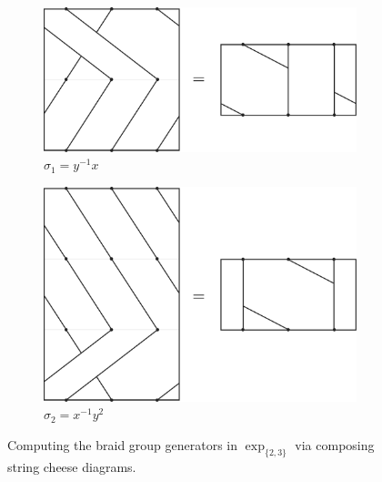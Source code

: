 \documentclass[12pt,twoside]{reedthesis}
\theoremstyle{definition}
\newcommand{\exptwothree}{\exp_{\{2,3\}}}
\begin{document}
\begin{figure}[h]
  \centering
  \begin{subfigure}[c]{0.47\textwidth}
    \centering
    \includegraphics[width=\linewidth]{figures/braid_gen_y_inv_x_equals.pdf}
    \caption{$\sigma_1 = y^{-1} x$}
  \end{subfigure}
  \hfill
  \begin{subfigure}[c]{0.47\textwidth}
    \centering
    \includegraphics[width=\linewidth]{figures/braid_gen_x_inv_y_y_equals.pdf}
    \caption{$\sigma_2 = x^{-1}y^2$}
  \end{subfigure}
  \caption{Computing the braid group generators in $\exptwothree$ via composing string cheese diagrams.}
  \label{fig:braid_gen_equals}
\end{figure}
\end{document}
